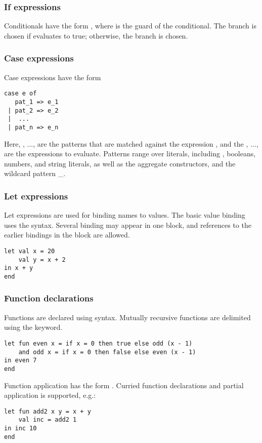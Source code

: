 \subsubsection{If expressions}
Conditionals have the form , where  is the guard of the conditional. 
The branch  is chosen if  evaluates to true; otherwise, the branch  is chosen.

\subsubsection{Case expressions}
Case expressions have the form
\begin{lstlisting}
case e of 
   pat_1 => e_1
 | pat_2 => e_2 
 |  ...
 | pat_n => e_n
\end{lstlisting}
Here, , ...,  are the patterns that are matched against the expression , and the , ...,  are the 
expressions to evaluate. Patterns range over literals, including \textcode{()}, booleans, numbers, and string literals, as well as the 
aggregate constructors, and the wildcard pattern \_.



\subsubsection{Let expressions}
Let expressions are used for binding names to values. The basic value binding uses the  syntax. 
Several binding may appear in one block, and references to the earlier bindings in the block are allowed. 
\begin{lstlisting}
let val x = 20
    val y = x + 2
in x + y
end  
\end{lstlisting}


\subsubsection{Function declarations}
\label{sec:letfun}
Functions are declared using  syntax. Mutually recursive functions 
are delimited using the  keyword.
\begin{lstlisting}
let fun even x = if x = 0 then true else odd (x - 1)
    and odd x = if x = 0 then false else even (x - 1)
in even 7
end    
\end{lstlisting}

Function application has the form . Curried function declarations and partial 
application is supported, e.g.:
\begin{lstlisting}
let fun add2 x y = x + y 
    val inc = add2 1 
in inc 10
end    
\end{lstlisting}



